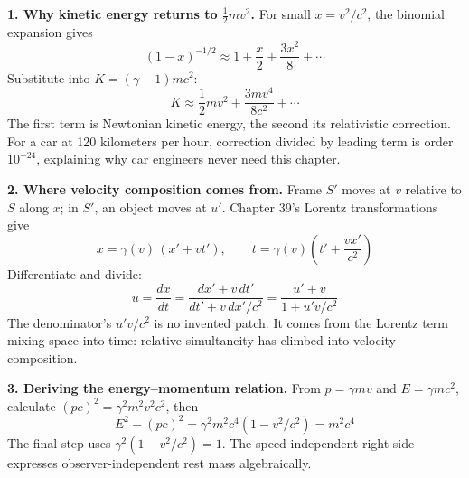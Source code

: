 \begin{mathbridge}
\textbf{1. Why kinetic energy returns to \(\tfrac12 mv^{2}\).} For small \(x=v^{2}/c^{2}\), the binomial expansion gives
\[
(1-x)^{-1/2}\approx 1+\frac{x}{2}+\frac{3x^{2}}{8}+\cdots
\]
Substitute into \(K=(\gamma-1)mc^{2}\):
\[
K\approx \frac12 mv^{2}+\frac{3mv^{4}}{8c^{2}}+\cdots
\]
The first term is Newtonian kinetic energy, the second its relativistic correction. For a car at 120 kilometers per hour, correction divided by leading term is order \(10^{-24}\), explaining why car engineers never need this chapter.

\textbf{2. Where velocity composition comes from.} Frame \(S'\) moves at \(v\) relative to \(S\) along \(x\); in \(S'\), an object moves at \(u'\). Chapter 39's Lorentz transformations give
\[
x=\gamma(v)\,(x'+vt'),\qquad t=\gamma(v)\left(t'+\frac{vx'}{c^{2}}\right)
\]
Differentiate and divide:
\[
u=\frac{dx}{dt}=\frac{dx'+v\,dt'}{dt'+v\,dx'/c^{2}}=\frac{u'+v}{1+u'v/c^{2}}
\]
The denominator's \(u'v/c^{2}\) is no invented patch. It comes from the Lorentz term mixing space into time: relative simultaneity has climbed into velocity composition.

\textbf{3. Deriving the energy--momentum relation.} From \(p=\gamma mv\) and \(E=\gamma mc^{2}\), calculate \((pc)^{2}=\gamma^{2}m^{2}v^{2}c^{2}\), then
\[
E^{2}-(pc)^{2}=\gamma^{2}m^{2}c^{4}(1-v^{2}/c^{2})=m^{2}c^{4}
\]
The final step uses \(\gamma^{2}(1-v^{2}/c^{2})=1\). The speed-independent right side expresses observer-independent rest mass algebraically.
\end{mathbridge}

